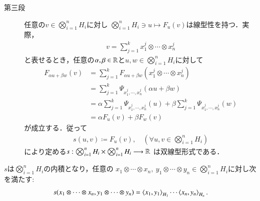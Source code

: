 \begin{description}
		\item[第三段]
			任意の$v \in \bigotimes_{i=1}^n H_i$に対し
			$\bigotimes_{i=1}^n H_i \ni u \longmapsto F_u(v)$は線型性を持つ．実際，
			\begin{align}
				v = \sum_{j=1}^k x^j_1 \otimes \cdots \otimes x^j_n
			\end{align}
			と表せるとき，任意の$\alpha,\beta \in \mathbb{R}$と$u,w \in \bigotimes_{i=1}^n H_i$に対して
			\begin{align}
				F_{\alpha u + \beta w}(v)
				&= \sum_{j=1}^k F_{\alpha u + \beta w}(x^j_1 \otimes \cdots \otimes x^j_n) \\
				&= \sum_{j=1}^k \Psi_{x^j_1, \cdots, x^j_n}(\alpha u + \beta w) \\
				&= \alpha \sum_{j=1}^k \Psi_{x^j_1, \cdots, x^j_n}(u)
					+ \beta \sum_{j=1}^k \Psi_{x^j_1, \cdots, x^j_n}(w) \\
				&= \alpha F_{u}(v) + \beta F_{w}(v)
			\end{align}
			が成立する．従って
			\begin{align}
				s(u,v) \coloneqq F_u(v),
				\quad (\forall u,v \in \bigotimes_{i=1}^n H_i)
				\label{eq:def_inner_product_of_tensor_product}
			\end{align}
			により定める$s:\bigotimes_{i=1}^n H_i \times \bigotimes_{i=1}^n H_i \longrightarrow \mathbb{R}$
			は双線型形式である．
	\end{description}
	
	\begin{screen}
		\begin{thm}
			$s$は$\bigotimes_{i=1}^n H_i$の内積となり，任意の
			$x_1 \otimes \cdots \otimes x_n,\ y_1 \otimes \cdots \otimes y_n 
			\in \bigotimes_{i=1}^n H_i$に対し次を満たす:
			\begin{align}
				s(x_1 \otimes \cdots \otimes x_n,y_1 \otimes \cdots \otimes y_n)
				= \inprod<x_1,y_1>_{H_1} \cdots \inprod<x_n,y_n>_{H_n}.
				\label{eq:def_inner_product_of_tensor_product_2}
			\end{align}
		\end{thm}
	\end{screen}
	
